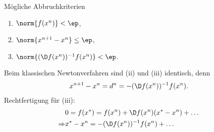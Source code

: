 Mögliche Abbruchkriterien
\begin{enumerate}[label=(\roman{*})]
\item $\norm{f(x^n)}< \ep$,
\item $\norm{x^{n+1}-x^n} \le \ep$,
\item $\norm{(\D f(x^n))^{-1}f(x^n)}<\ep$.
\end{enumerate}
Beim klassischen Newtonverfahren sind (ii) und (iii) identisch, denn
\begin{align*}
x^{n+1}-x^n = d^n = -(\D f(x^n))^{-1}f(x^n).
\end{align*}
Rechtfertigung für (iii):
\begin{align*}
&0 = f(x^*) = f(x^n) + \D f(x^n)(x^*-x^n) + \ldots\\
\Rightarrow & x^* -x^n = -(\D f(x^n))^{-1}f(x^n) + \ldots
\end{align*}